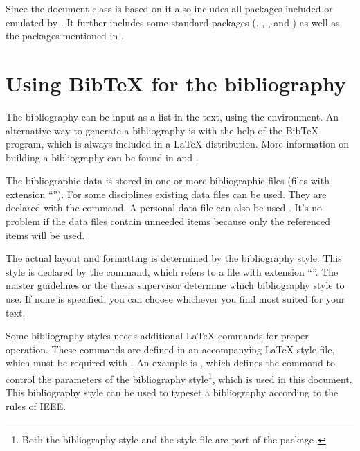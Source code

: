 Since the document class  is based on  it also
includes all packages included or emulated by .
It further includes some standard packages (, ,
, and ) as well as the packages mentioned in
.

\section{Using BibTeX for the bibliography}
\label{sec:bibtex}
The bibliography can be input as a list in the text, using the
 environment. An alternative way to generate a
bibliography is with the help of the BibTeX program, which is always
included in a LaTeX distribution. More information on building a
bibliography can be found in \cite{tamethebeast} and \cite{btxfaq}.

The bibliographic data is stored in one or more bibliographic files (files
with extension ``''). For some disciplines existing data files
can be used. They are declared with the  command. A
personal data file can also be used \cite[part~3]{tamethebeast}. It's no
problem if the data files contain unneeded items because only the
referenced items will be used.

The actual layout and formatting is determined by the bibliography style.
This style is declared by the  command, which refers
to a file with extension ``''. The master guidelines or the
thesis supervisor determine which bibliography style to use. If none is
specified, you can choose whichever you find most suited for your text.

Some bibliography styles needs additional LaTeX commands for proper
operation. These commands are defined in an accompanying LaTeX style file,
which must be required with . An example is
, which defines the command  to control
the parameters of the  bibliography style\footnote{Both the
   bibliography style and the  style file
  are part of the  package\,\cite{pkg:IEEEtran}.}, which is
used in this document. This bibliography style can be used to typeset a
bibliography according to the rules of IEEE\@.

